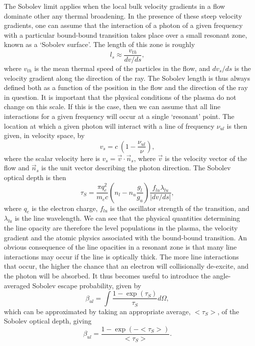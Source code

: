 The Sobolev limit applies when the local bulk velocity gradients in a flow 
dominate other any thermal broadening. In the presence of these steep
velocity gradients, one can assume that the interaction of a photon of a given frequency
with a particular 
bound-bound transition takes place over a small resonant zone, known as a 
`Sobolev surface'. The length of this zone is roughly
\begin{equation}
l_s \approx \frac{v_{th}}{dv / ds},
\end{equation}
where $v_{th}$ is the mean thermal speed of the particles in the flow, and 
$dv_s / ds$ is the velocity gradient along the direction of the ray. 
The Sobolev length is thus always defined
both as a function of the position in the flow and the direction of the ray in question.
It is important that the physical conditions of the plasma do not change on this scale.
If this is the case, then we can assume that all line interactions for a given 
frequency will occur at a single `resonant' point. The location at which
a given photon will interact with a line of frequency $\nu_{ul}$
is then given, in velocity space, by
\begin{equation}
v_s = c~\left(1 - \frac{\nu_{ul}}{\nu}\right),
\label{eq:resonance}
\end{equation}
where the scalar velocity here is $v_s=\vec{v}\cdot \vec{n}_s$, where $\vec{v}$
is the velocity vector of the flow and $\vec{n}_s$ is the unit vector describing the
photon direction. The Sobolev optical depth is then
\begin{equation}
\tau_S = \frac{\pi q_e^2}{m_e c}  \left(n_l - n_u \frac{g_l}{g_u} \right) \frac{f_{lu} \lambda_{lu}}{| dv / ds |},
\label{eq:tau_sob}
\end{equation}
where $q_e$ is the electron charge, $f_{lu}$ is the oscillator strength of the transition,
and $\lambda_{lu}$ is the line wavelength.
We can see that the physical quantities determining the line opacity are therefore 
the level populations in the plasma, the velocity gradient and the atomic physics
associated with the bound-bound transition. An obvious consequence of the line opacities
in a resonant zone is that many line interactions may occur if the line is
optically thick. The more line interactions that occur, the higher the chance
that an electron will collisionally de-excite, and the photon will be absorbed.
It thus becomes useful to introduce the angle-averaged Sobolev escape probability,
given by
\begin{equation}
\beta_{ul} = \int \frac{1 - \exp(\tau_S)}{\tau_S} d\Omega,
\label{eq:beta_sob}
\end{equation}
which can be approximated by taking an appropriate
average, $<\tau_S>$, of the Sobolev optical depth, giving 
\begin{equation}
\beta_{ul} = \frac{1 - \exp(-<\tau_S>)}{<\tau_S>}.
\label{eq:beta_sob}
\end{equation}


